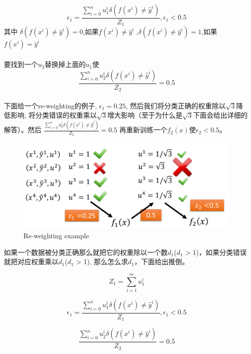\begin{equation*}
    {\epsilon}_1 = \frac{\sum_{i=0}^{n} u_1^i \delta(f(x^i) \neq \hat{y}^i)}{Z_1}, {\epsilon}_1 < 0.5
\end{equation*}
其中 $\delta(f(x^i) \neq \hat{y}^i) = 0$,如果$f(x^i) \neq \hat{y}^i$
,$\delta(f(x^i) \neq \hat{y}^i) = 1$,如果$f(x^i) = \hat{y}^i$\\\\
要找到一个$u_2$替换掉上面的$u_1$使
\begin{equation*}
    \frac{\sum_{i=0}^{n} u_2^i \delta(f(x^i) \neq \hat{y}^i)}{Z_2} = 0.5
\end{equation*}
\\

下面给一个re-weighting的例子, $\epsilon_1 = 0.25$, 然后我们将分类正确的权重除以$\sqrt{3}$降低影响,
 将分类错误的权重乘以$\sqrt{3}$增大影响（至于为什么是$\sqrt{3}$下面会给出详细的解答）。然后 $\frac{\sum_{i=0}^{n} u_2^i \delta(f(x^i) \neq \hat{y}^i)}{Z_2} = 0.5$
 再重新训练一个$f_2(x)$使$\epsilon_2 < 0.5$。

\begin{figure}[H]
    \centerline{\includegraphics[scale=0.3]{Part1/Chapter/images/reweightexample1.png}}
    \caption{Re-weighting example}
\end{figure}

如果一个数据被分类正确那么就把它的权重除以一个数$d_1$($d_1$ > 1)，如果分类错误就把对应权重乘以$d_1$($d_1$ > 1), 那么怎么求$d_1$，下面给出推倒。

\begin{equation*}
    Z_1 = \sum_{i=1}^m u_1^i
\end{equation*}

\begin{equation*}
    {\epsilon}_1 = \frac{\sum_{i=0}^{n} u_1^i \delta(f(x^i) \neq \hat{y}^i)}{Z_1}, {\epsilon}_1 < 0.5
\end{equation*}

\begin{equation*}
    \frac{\sum_{i=0}^{n} u_2^i \delta(f(x^i) \neq \hat{y}^i)}{Z_2} = 0.5
\end{equation*}
\\

